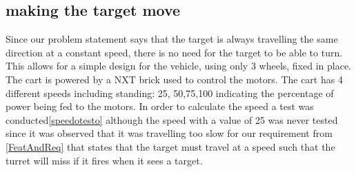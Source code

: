 \subsection{making the target move}
Since our problem statement says that the target is always travelling the same direction
at a constant speed, there is no need for the target to be able to turn. This allows
for a simple design for the vehicle, using only 3 wheels, fixed in place. The cart
is powered by a NXT brick used to control the motors. The cart has 4 different speeds including standing:
25, 50,75,100 indicating the percentage of power being fed to the motors. In order to
calculate the speed a test was conducted\autoref{speedotesto}
although the speed with a value of 25 was never tested since it was observed that
it was travelling too slow for our requirement from \autoref{FeatAndReq} that states
that the target must travel at a speed such that the turret will miss if it fires when
it sees a target.
